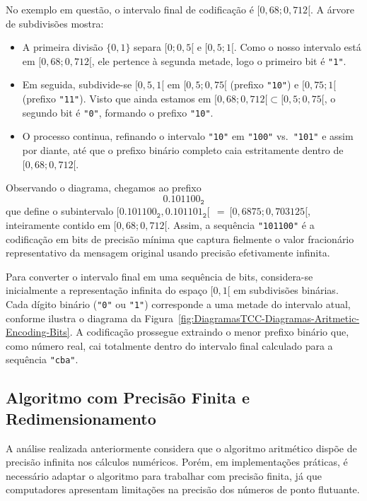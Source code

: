 No exemplo em questão, o intervalo final de codificação é \([0{,}68;0{,}712[\). A árvore de subdivisões mostra:
\begin{itemize}
  \item A primeira divisão \(\{0,1\}\) separa \([0; 0{,}5[\) e \([0{,}5; 1[\). Como o nosso intervalo está em \([0{,}68; 0{,}712[\), ele pertence à segunda metade, logo o primeiro bit é \texttt{"1"}.
  \item Em seguida, subdivide-se \([0{,}5,1[\) em \([0{,}5; 0{,}75[\) (prefixo \texttt{"10"}) e \([0{,}75{;}1[\) (prefixo \texttt{"11"}). Visto que ainda estamos em \([0{,}68; 0{,}712[\subset[0{,}5; 0{,}75[\), o segundo bit é \texttt{"0"}, formando o prefixo \texttt{"10"}.
  \item O processo continua, refinando o intervalo \texttt{"10"} em \texttt{"100"} vs.\ \texttt{"101"} e assim por diante, até que o prefixo binário completo caia estritamente dentro de \([0{,}68;0{,}712[\). 
\end{itemize}

Observando o diagrama, chegamos ao prefixo
\[
\mathtt{0.101100_2}
\]
que define o subintervalo $[\mathtt{0.101100_2}, \mathtt{0.101101_2}[ ~~ = ~ [0{,}6875;0{,}703125[$, inteiramente contido em $[0{,}68;0{,}712[$. Assim, a sequência \texttt{"101100"} é a codificação em bits de precisão mínima que captura fielmente o valor fracionário representativo da mensagem original usando precisão efetivamente infinita.


Para converter o intervalo final em uma sequência de bits, considera-se inicialmente a representação infinita do espaço \([0,1[\) em subdivisões binárias. Cada dígito binário (\texttt{"0"} ou \texttt{"1"}) corresponde a uma metade do intervalo atual, conforme ilustra o diagrama da Figura~\ref{fig:DiagramasTCC-Diagramas-Aritmetic-Encoding-Bits}. A codificação prossegue extraindo o menor prefixo binário que, como número real, cai totalmente dentro do intervalo final calculado para a sequência \texttt{"cba"}. 

\subsection{Algoritmo com Precisão Finita e Redimensionamento}

A análise realizada anteriormente considera que o algoritmo aritmético dispõe de precisão infinita nos cálculos numéricos. Porém, em implementações práticas, é necessário adaptar o algoritmo para trabalhar com precisão finita, já que computadores apresentam limitações na precisão dos números de ponto flutuante.

